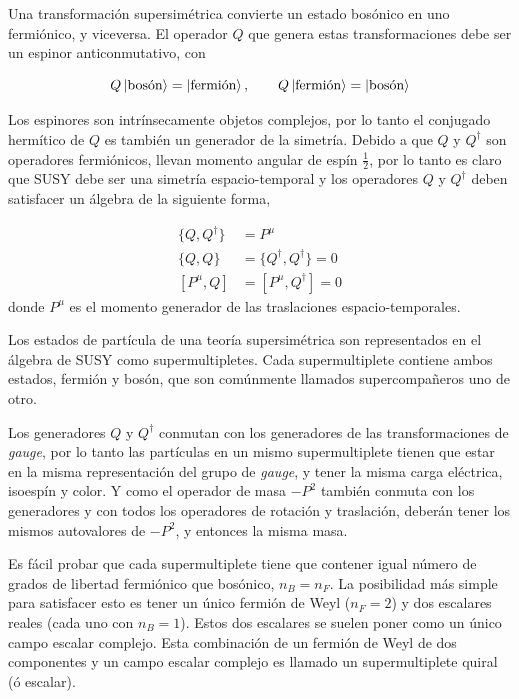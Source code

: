 Una transformación supersimétrica convierte un estado bosónico en uno
fermiónico, y viceversa. El operador $Q$ que genera estas transformaciones debe
ser un espinor anticonmutativo, con

\begin{equation}
  Q \left| \text{bosón} \right> = \left| \text{fermión} \right>, \quad \quad Q
  \left| \text{fermión} \right> = \left| \text{bosón} \right>
\end{equation}

Los espinores son intrínsecamente objetos complejos, por lo tanto el conjugado
hermítico de $Q$ es también un generador de la simetría. Debido a que $Q$ y
$Q^\dagger$ son operadores fermiónicos, llevan momento angular de espín $\frac{1}{2}$, por
lo tanto es claro que SUSY debe ser una simetría espacio-temporal y los
operadores $Q$ y $Q^\dagger$ deben satisfacer un álgebra de la siguiente forma,

\begin{align}
  \{Q, Q^\dagger\} &= P^\mu \\
  \{Q, Q\} &= \{Q^\dagger, Q^\dagger\} = 0 \\
  [P^\mu, Q] &= [P^\mu, Q^\dagger] = 0
\end{align}
%
donde $P^\mu$ es el momento generador de las traslaciones
espacio-temporales.

Los estados de partícula de una teoría supersimétrica son representados en el
álgebra de SUSY como supermultipletes. Cada supermultiplete contiene
ambos estados, fermión y bosón, que son comúnmente llamados supercompa\~neros
uno de otro.

Los generadores $Q$ y $Q^\dagger$ conmutan con los generadores de las
transformaciones de \emph{gauge}, por lo tanto las partículas en un mismo
supermultiplete tienen que estar en la misma representación del grupo de \emph{gauge},
y tener la misma carga eléctrica, isoespín y color. Y como el operador de masa
$-P^2$ también conmuta con los generadores y con todos los operadores de
rotación y traslación, deberán tener los mismos autovalores de $-P^2$, y
entonces la misma masa.

Es fácil probar que cada supermultiplete tiene que contener igual número de
grados de libertad fermiónico que bosónico, $n_B = n_F$. La posibilidad más
simple para satisfacer esto es tener un único fermión de Weyl ($n_F=2$) y dos
escalares reales (cada uno con $n_B=1$). Estos dos escalares se suelen poner
como un único campo escalar complejo. Esta combinación de un fermión de Weyl de
dos componentes y un campo escalar complejo es llamado un supermultiplete
quiral (ó escalar).

